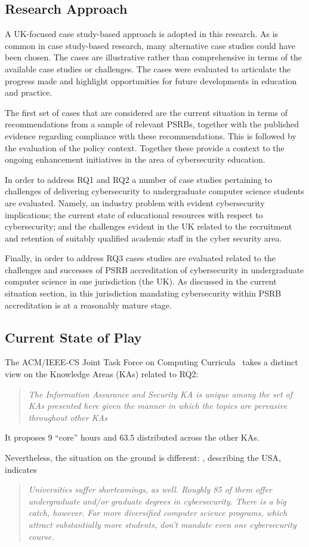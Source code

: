 \documentclass[conference]{IEEEtran}
\begin{document}
\subsection{Research Approach}
A UK-focused case study-based approach is adopted in this research. As is common in case study-based research, many alternative case studies could have been chosen. The cases are illustrative rather than comprehensive in terms of the available case studies or challenges. The cases were evaluated to articulate the progress made and highlight opportunities for future developments in education and practice. 

The first set of cases that are considered are the current situation in terms of recommendations from a sample of relevant PSRBs, together with the published evidence regarding compliance with these recommendations. This is followed by the evaluation of the policy context. Together these provide a context to the ongoing enhancement initiatives in the area of cybersecurity education.

In order to address RQ1 and RQ2 a number of case studies pertaining to challenges of delivering cybersecurity to undergraduate computer science students are evaluated. Namely, an industry problem with evident cybersecurity implications; the current state of educational resources with respect to cybersecurity; and the challenges evident in the UK related to the recruitment and retention of suitably qualified academic staff in the cyber security area. 

Finally, in order to address RQ3 cases studies are evaluated related to the challenges and successes of PSRB accreditation of cybersecurity in undergraduate computer science in one jurisdiction (the UK). As discussed in the current situation section, in this jurisdiction mandating cybersecurity within PSRB accreditation is at a reasonably mature stage.

\subsection{Current State of Play}
The ACM/IEEE-CS Joint Task Force on Computing Curricula~\cite[p.~97]{ACM2013a} takes a distinct view on the Knowledge Areas (KAs) related to RQ2:
\begin{quote}
{\emph{The Information Assurance and Security KA is unique among the set of KAs presented here
given the manner in which the topics are pervasive throughout other KAs}}
\end{quote}
It proposes 9 ``core'' hours and 63.5 distributed across the other KAs.
\par
Nevertheless, the situation on the ground is different: \cite{Ackerman2019a}, describing the USA, indicates
\begin{quote}
{\emph{Universities suffer shortcomings, as well. Roughly 85 of them offer undergraduate and/or graduate degrees in cybersecurity. There is a big catch, however. Far more diversified computer science programs, which attract substantially more students, don't mandate even one cybersecurity course.}}
\end{quote}
\end{document}
